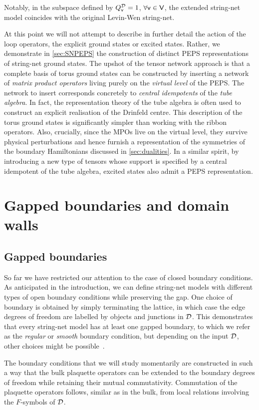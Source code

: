 Notably, in the subspace defined by $Q^{\mathcal{D}}_{\mathsf{v}}=1$, $\forall\mathsf{v}\in\mathsf{V}$, the extended string-net model coincides with the original Levin-Wen string-net.

\bigskip\noindent At this point we will not attempt to describe in further detail the action of the loop operators, the explicit ground states or excited states. Rather, we demonstrate in \cref{sec:SNPEPS} the construction of distinct PEPS representations of string-net ground states. The upshot of the tensor network approach is that a complete basis of torus ground states can be constructed by inserting a network of \emph{matrix product operators} living purely on the \emph{virtual level} of the PEPS. The network to insert corresponds concretely to \emph{central idempotents} of the \emph{tube algebra}. In fact, the representation theory of the tube algebra is often used to construct an explicit realisation of the Drinfeld centre. This description of the torus ground states is significantly simpler than working with the ribbon operators. Also, crucially, since the MPOs live on the virtual level, they survive physical perturbations and hence furnish a representation of the symmetries of the boundary Hamiltonians discussed in \cref{sec:dualities}. In a similar spirit, by introducing a new type of tensors whose support is specified by a central idempotent of the tube algebra, excited states also admit a PEPS representation.
\section{Gapped boundaries and domain walls}\label{sec:Bdry}
\subsection{Gapped boundaries} 
So far we have restricted our attention to the case of closed boundary conditions. As anticipated in the introduction, we can define string-net models with different types of open boundary conditions while preserving the gap. One choice of boundary is obtained by simply terminating the lattice, in which case the edge degrees of freedom are labelled by objects and junctions in $\mathcal{D}$. This demonstrates that every string-net model has at least one gapped boundary, to which we refer as the \emph{regular} or \emph{smooth} boundary condition, but depending on the input $\mathcal{D}$, other choices might be possible~\cite{Kitaev2011,Kong2015}.

The boundary conditions that we will study momentarily are constructed in such a way that the bulk plaquette operators can be extended to the boundary degrees of freedom while retaining their mutual commutativity. Commutation of the plaquette operators follows, similar as in the bulk, from local relations involving the $F$-symbols of $\mathcal{D}$.

